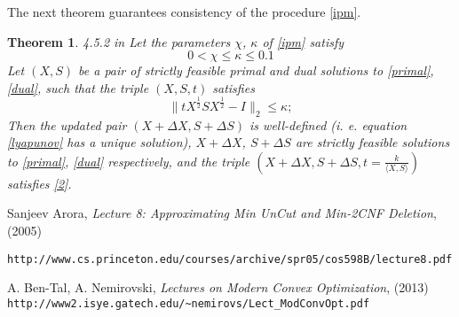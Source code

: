 \documentclass[12pt]{article}
\begin{document}
The next theorem guarantees consistency of the procedure \ref{ipm}.
\newtheorem{Th}{Theorem}
\begin{Th}{4.5.2 in \cite{nemirovski}}
	Let the parameters $\chi$, $\kappa$ of \ref{ipm} satisfy
	\[
		0 < \chi \leq \kappa \leq 0.1
	\]
	Let $(X, S)$ be a pair of strictly feasible primal and dual solutions to \ref{primal}, 
	\ref{dual}, such that the triple $(X, S, t)$ satisfies
	\begin{equation}
	\label{2}
		\| t X^{\frac12} S X^{\frac12} - I \|_2 \leq \kappa;
	\end{equation}
	Then the updated pair $(X + \Delta X, S + \Delta S)$ is well-defined (i. e. equation 
	\ref{lyapunov} has a unique solution), $X + \Delta X$, $S + \Delta S$ are strictly 
	feasible solutions to \ref{primal}, \ref{dual} respectively, and the triple $\left(X + 
	\Delta X, S + \Delta S, t = \frac k{ \langle X, S \rangle } \right)$ satisfies \ref{2}.
\end{Th}
	
\renewcommand{\refname}{References}
\begin{thebibliography}{0}
		Sanjeev Arora, {\it Lecture 8: Approximating Min UnCut and Min-2CNF
Deletion}, (2005)
    
    \verb'http://www.cs.princeton.edu/courses/archive/spr05/cos598B/lecture8.pdf'
	
	A. Ben-Tal, A. Nemirovski, {\it Lectures on Modern Convex Optimization}, (2013)\\ 
	\verb'http://www2.isye.gatech.edu/~nemirovs/Lect_ModConvOpt.pdf'
\end{thebibliography}
\end{document}
